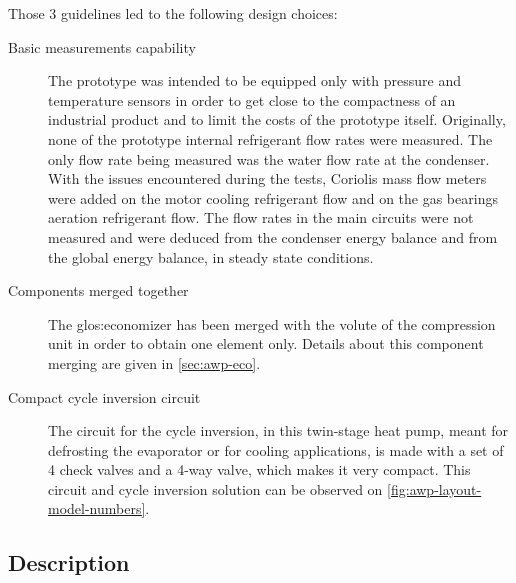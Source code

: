 Those 3 guidelines led to the following design choices:
\begin{description}
\item[Basic measurements capability] The prototype was intended to be
  equipped only with pressure and temperature sensors in order to get
  close to the compactness of an industrial product and to limit the
  costs of the prototype itself. Originally, none of the prototype
  internal refrigerant flow rates were measured. The only flow rate
  being measured was the water flow rate at the condenser. With the
  issues encountered during the tests, Coriolis mass flow meters were
  added on the motor cooling refrigerant flow and on the gas bearings
  aeration refrigerant flow. The flow rates in the main circuits were
  not measured and were deduced from the condenser energy
  balance and from the global energy balance, in steady state
  conditions.
\item[Components merged together] The
  \gls{glos:economizer} has been merged with the
  volute of the compression unit in order to obtain one element
  only. Details about this component merging are given in
  \cref{sec:awp-eco}.
\item[Compact cycle inversion circuit] The circuit for the cycle
  inversion, in this twin-stage heat pump, meant for defrosting the
  evaporator or for cooling applications, is made with a set of 4
  check valves and a
  4-way valve,
  which makes it very compact. This circuit and cycle inversion
  solution can be observed on \cref{fig:awp-layout-model-numbers}.
\end{description}

\subsection{Description}
\label{sec:awp-description}

